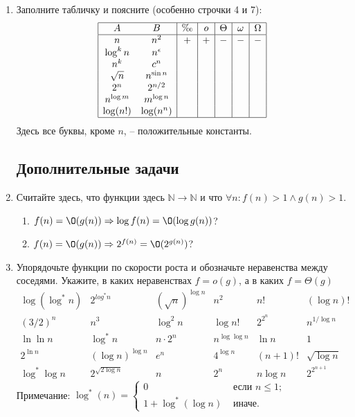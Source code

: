 \begin{enumerate}
  \item Заполните табличку и поясните (особенно строчки 4 и 7):
    $$
    \begin{array}{|cc|c|c|c|c|c|}
      \hline
      A & B & \O & o & \Theta & \omega & \Omega \\
      \hline
      n & n^2 & + & + & - & - & - \\
      \log^k n & n^{\epsilon} & & & & & \\
      n^k & c^n & & & & & \\
      \sqrt{n} & n^{\sin n} & & & & & \\
      2^n & 2^{n \slash 2} & & & & & \\
      n^{\log m} & m^{\log n} & & & & & \\
      \log (n!) & \log(n^n) & & & & & \\
      \hline
    \end{array}
    $$
    Здесь все буквы, кроме $n$, -- положительные константы.

\subsection*{Дополнительные задачи}
    
    \item  
    Считайте здесь, что функции здесь $\mathbb{N} \to \mathbb{N}$ и что $\forall n : f(n) > 1 \land g(n) > 1$.
    \begin{enumerate}
      \item $f(n) = \O(g(n)) \Rightarrow \log f(n) = \O(\log g(n))$?
      \item $f(n) = \O(g(n)) \Rightarrow 2^{f(n)} = \O(2^{g(n)})$?
    \end{enumerate}

	\item
	Упорядочьте функции по скорости роста и обозначьте неравенства между соседями. 
	Укажите, в каких неравенствах $f = o(g)$, а в каких $f = \Theta(g)$
	$$
	\begin{array}{cccccc}
	\log(\log^* n) & 2^{log^* n} & (\sqrt{n})^{\log n} & n^2 & n! & (\log n)! \\
	(3 \slash 2)^n & n^3 & \log^2 n & \log n! & 2^{2^n} & n^{1 \slash \log n} \\
	\ln \ln n & \log^* n & n \cdot 2^n & n^{\log \log n} & \ln n & 1 \\
	2^{\ln n} & (\log n)^{\log n} & e^n & 4^{\log n} & (n + 1)! & \sqrt{\log n} \\
	\log^* \log n & 2^{\sqrt{2 \log n}} & n & 2^n & n \log n & 2^{2^{n + 1}}					
	\end{array}
	$$
	Примечание: $\log^*(n) = \left\{
	\begin{array}{ll}
	0 & \texttt{ если } n \leq 1;\\
	1 + \log^*(\log n) & \texttt{ иначе.}
	\end{array}
	\right.$
\end{enumerate}

\clearpage
